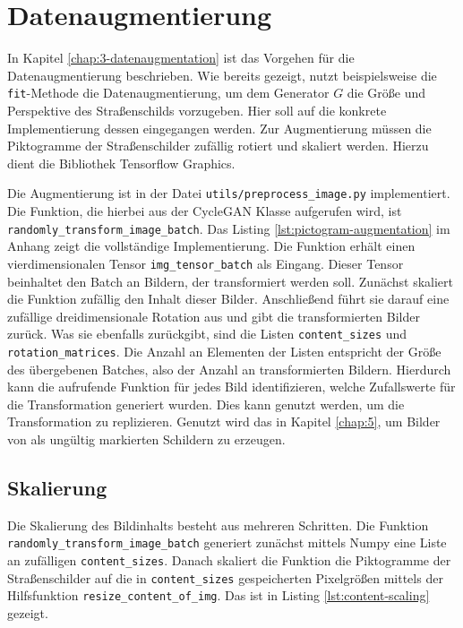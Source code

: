 \section{Datenaugmentierung}
In Kapitel \ref{chap:3-datenaugmentation} ist das Vorgehen für die Datenaugmentierung beschrieben. Wie bereits gezeigt, nutzt beispielsweise die \texttt{fit}-Methode die Datenaugmentierung, um dem Generator $G$ die Größe und Perspektive des Straßenschilds vorzugeben. Hier soll auf die konkrete Implementierung dessen eingegangen werden. Zur Augmentierung müssen die Piktogramme der Straßenschilder zufällig rotiert und skaliert werden. Hierzu dient die Bibliothek Tensorflow Graphics.

Die Augmentierung ist in der Datei \texttt{utils/preprocess_image.py} implementiert. Die Funktion, die hierbei aus der CycleGAN Klasse aufgerufen wird, ist \texttt{randomly_transform_image_batch}. Das Listing \ref{lst:pictogram-augmentation} im Anhang zeigt die vollständige Implementierung. Die Funktion erhält einen vierdimensionalen Tensor \texttt{img_tensor_batch} als Eingang. Dieser Tensor beinhaltet den Batch an Bildern, der transformiert werden soll. Zunächst skaliert die Funktion zufällig den Inhalt dieser Bilder. Anschließend führt sie darauf eine zufällige dreidimensionale Rotation aus und gibt die transformierten Bilder zurück. Was sie ebenfalls zurückgibt, sind die Listen \texttt{content_sizes} und \texttt{rotation_matrices}. Die Anzahl an Elementen der Listen entspricht der Größe des übergebenen Batches, also der Anzahl an transformierten Bildern. Hierdurch kann die aufrufende Funktion für jedes Bild identifizieren, welche Zufallswerte für die Transformation generiert wurden. Dies kann genutzt werden, um die Transformation zu replizieren. Genutzt wird das in Kapitel \ref{chap:5}, um Bilder von als ungültig markierten Schildern zu erzeugen.

\subsection{Skalierung}
Die Skalierung des Bildinhalts besteht aus mehreren Schritten. Die Funktion \texttt{randomly_transform_image_batch} generiert zunächst mittels Numpy eine Liste an zufälligen \texttt{content_sizes}. Danach skaliert die Funktion die Piktogramme der Straßenschilder auf die in \texttt{content_sizes} gespeicherten Pixelgrößen mittels der Hilfsfunktion \texttt{resize_content_of_img}. Das ist in Listing \ref{lst:content-scaling} gezeigt.

